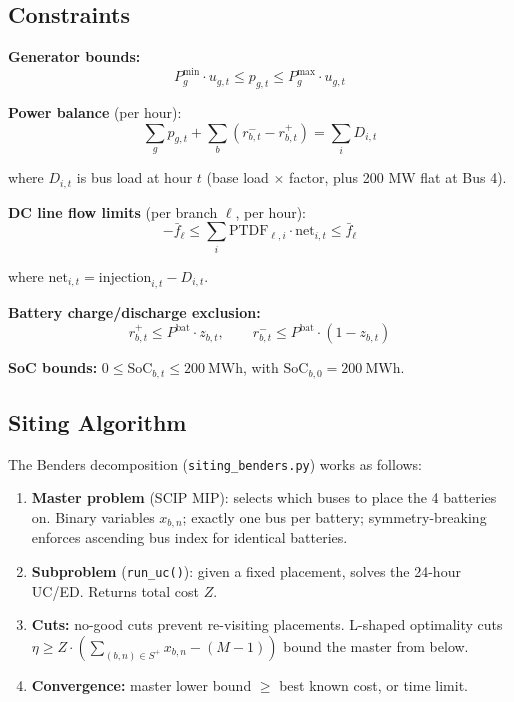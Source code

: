 \documentclass[11pt]{article}
\begin{document}
\subsection{Constraints}

\textbf{Generator bounds:}
\[
P^{\min}_g \cdot u_{g,t} \leq p_{g,t} \leq P^{\max}_g \cdot u_{g,t}
\]

\textbf{Power balance} (per hour):
\[
\sum_g p_{g,t} + \sum_b (r^-_{b,t} - r^+_{b,t}) = \sum_i D_{i,t}
\]

where $D_{i,t}$ is bus load at hour $t$ (base load $\times$ factor, plus 200 MW flat at Bus 4).

\textbf{DC line flow limits} (per branch $\ell$, per hour):
\[
-\bar{f}_\ell \leq \sum_i \mathrm{PTDF}_{\ell,i} \cdot \mathrm{net}_{i,t} \leq \bar{f}_\ell
\]

where $\mathrm{net}_{i,t} = \mathrm{injection}_{i,t} - D_{i,t}$.

\textbf{Battery charge/discharge exclusion:}
\[
r^+_{b,t} \leq P^{\mathrm{bat}} \cdot z_{b,t}, \qquad r^-_{b,t} \leq P^{\mathrm{bat}} \cdot (1 - z_{b,t})
\]

\textbf{SoC bounds:} $0 \leq \mathrm{SoC}_{b,t} \leq 200~\mathrm{MWh}$, with $\mathrm{SoC}_{b,0} = 200~\mathrm{MWh}$.

\subsection{Siting Algorithm}

The Benders decomposition (\texttt{siting\_benders.py}) works as follows:

\begin{enumerate}[noitemsep]
  \item \textbf{Master problem} (SCIP MIP): selects which buses to place the 4 batteries on. Binary variables $x_{b,n}$; exactly one bus per battery; symmetry-breaking enforces ascending bus index for identical batteries.
  \item \textbf{Subproblem} (\texttt{run\_uc()}): given a fixed placement, solves the 24-hour UC/ED. Returns total cost $Z$.
  \item \textbf{Cuts:} no-good cuts prevent re-visiting placements. L-shaped optimality cuts $\eta \geq Z \cdot (\sum_{(b,n)\in S^+} x_{b,n} - (M-1))$ bound the master from below.
  \item \textbf{Convergence:} master lower bound $\geq$ best known cost, or time limit.
\end{enumerate}
\end{document}
